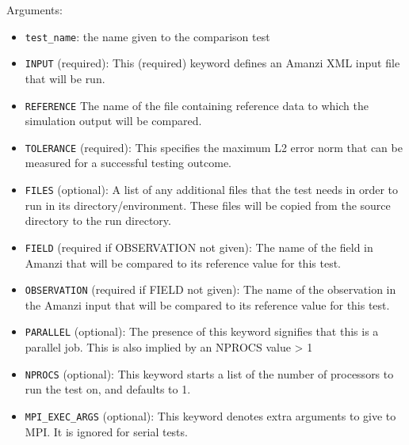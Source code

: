 Arguments:
\begin{itemize}
\item \verb|test_name|: the name given to the comparison test 
\item \verb|INPUT| (required): This (required) keyword defines an Amanzi XML input file that will 
      be run.
\item \verb|REFERENCE| The name of the file containing reference data to which 
      the simulation output will be compared.
\item \verb|TOLERANCE| (required): This specifies the maximum L2 error norm that can be 
      measured for a successful testing outcome.
\item \verb|FILES| (optional): A list of any additional files that the test needs in order 
      to run in its directory/environment. These files will be copied from the source 
      directory to the run directory.
\item \verb|FIELD| (required if OBSERVATION not given): The name of the field in Amanzi that 
      will be compared to its reference value for this test.
\item \verb|OBSERVATION| (required if FIELD not given): The name of the observation in the Amanzi 
      input that will be compared to its reference value for this test.
\item \verb|PARALLEL| (optional): The presence of this keyword signifies that this is 
      a parallel job. This is also implied by an NPROCS value > 1
\item \verb|NPROCS| (optional): This keyword starts a list of the number of processors to
      run the test on, and defaults to 1.
\item \verb|MPI_EXEC_ARGS| (optional): This keyword denotes extra arguments to give to
      MPI. It is ignored for serial tests.
\end{itemize}

